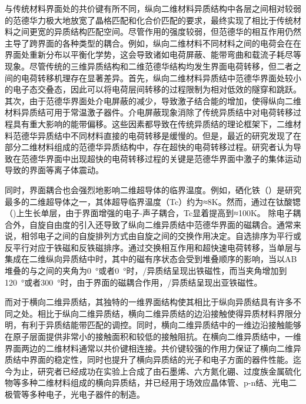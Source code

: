     与传统材料界面处的共价键有所不同，纵向二维材料异质结构中各层之间相对较弱的范德华力极大地放宽了晶格匹配和化合价匹配的要求，最终实现了相比于传统材料之间更宽的异质结构匹配空间。尽管作用的强度较弱，但范德华的相互作用仍然主导了跨界面的各种类型的耦合。例如，纵向二维材料不同材料之间的电荷会在在界面处重新分布以平衡化学势，这会导致诸如电荷屏蔽、能带弯曲和载流子耗尽等现象。尽管传统的三维异质结构和二维范德华结构均发生界面电荷转移，但二者之间的电荷转移机理存在显著差异。首先，纵向二维材料异质结中范德华界面处较小的电子态交叠态，因此可以将电荷层间转移的过程限制为相对低效的隧穿和跳跃。其次，由于范德华界面处介电屏蔽的减少，导致激子结合能的增加，使得纵向二维材料异质结可用于常温激子器件。介电屏蔽现象消除了传统异质结中对电荷转移过程具有重大影响的能带偏移。这些因素都导致在传统异质结的理论框架下，二维材料范德华异质结中不同材料直接的电荷转移是缓慢的。但是，最近的研究发现了在部分二维材料组成的范德华异质结构中，存在超快的电荷转移过程。研究者认为导致在范德华界面中出现超快的电荷转移过程的关键是范德华界面中激子的集体运动导致的界面等离子体震动。

    同时，界面耦合也会强烈地影响二维超导体的临界温度。例如，硒化铁（）是研究最多的二维超导体之一，其体超导临界温度（Tc）约为≈8K。然而，通过在钛酸锶（)上生长单层，由于界面增强的电子-声子耦合，Tc显着提高到≈100K。
    除电子耦合外，自旋自由度的引入还导致了纵向二维异质结中范德华界面的磁耦合。通常来说，相邻电子之间的自旋排列方式由自旋之间的交换作用决定。自选排序为平行或反平行对应于铁磁和反铁磁排序。通过交换相互作用和超快速电荷转移，当单层与集成在二维纵向异质结中时，其中的磁有序状态会受到堆叠顺序的影响，当以AB堆叠的与之间的夹角为\SI{0}{\degree}或者\SI{0}{\degree}时，/异质结呈现出铁磁性，而当夹角增加到\SI{120}{\degree}或者\SI{300}{\degree}时，由于界面的磁耦合作用，/异质结呈现出亚铁磁性。

    而对于横向二维异质结，其独特的一维界面结构使其相比于纵向异质结具有许多不同之处。相比于纵向二维异质结，横向二维异质结的边沿接触使得异质材料界限分明，有利于异质结能带匹配的调控。同时，横向二维异质结中的一维边沿接触能够在原子层面提供非常小的接触面积和较低的接触阻抗。在横向二维异质结中，一维界面两边的二维材料通常以共价键相连接。共价键较强的作用力保证了横向二维异质结中界面的稳定性，同时也提升了横向异质结的光子和电子方面的器件性能。迄今为止，研究者已经成功在实验上合成了由石墨烯、六方氮化硼、过度族金属硫化物等多种二维材料组成的横向异质结，并已经用于场效应晶体管、p-n结、光电二极管等多种电子，光电子器件的制造。

